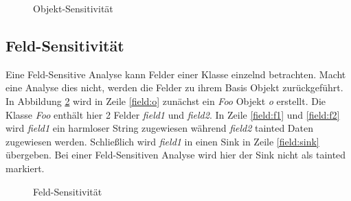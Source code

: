 \documentclass[runningheads]{llncs}
\begin{document}
\begin{figure}

\caption{Objekt-Sensitivität}
\label{fig:object_code} 
\end{figure}

\subsection{Feld-Sensitivität}
Eine Feld-Sensitive Analyse kann Felder einer Klasse einzelnd betrachten. Macht eine Analyse dies nicht, werden die Felder zu ihrem Basis Objekt zurückgeführt.
In Abbildung \ref{fig:field_code} wird in Zeile \ref{field:o} zunächst ein \emph{Foo} Objekt \emph{o} erstellt. Die Klasse \emph{Foo} enthält hier 2 Felder \emph{field1} und \emph{field2}. In Zeile \ref{field:f1} und \ref{field:f2} wird \emph{field1} ein harmloser String zugewiesen während \emph{field2} tainted Daten zugewiesen werden. Schließlich wird \emph{field1} in einen Sink in Zeile \ref{field:sink} übergeben. Bei einer Feld-Sensitiven Analyse wird hier der Sink nicht als tainted markiert.

\begin{figure}

\caption{Feld-Sensitivität}
\label{fig:field_code}
\end{figure}
\end{document}
